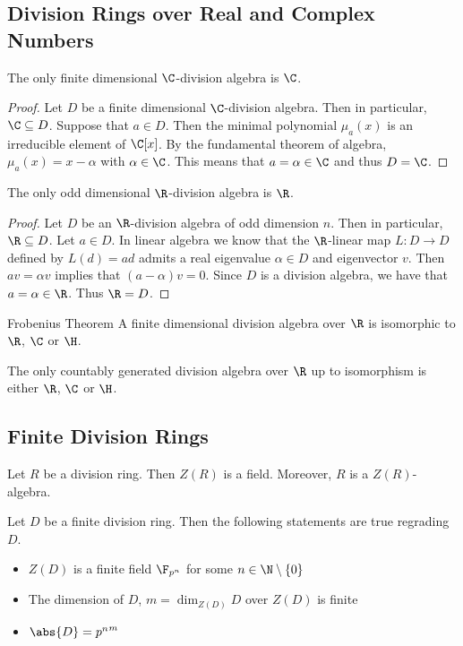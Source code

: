 \documentclass[a4paper]{article}
\begin{document}
\subsection{Division Rings over Real and Complex Numbers}
\begin{prp}{}{} The only finite dimensional $\C$-division algebra is $\C$. \tcbline
\begin{proof}
Let $D$ be a finite dimensional $\C$-division algebra. Then in particular, $\C\subseteq D$. Suppose that $a\in D$. Then the minimal polynomial $\mu_a(x)$ is an irreducible element of $\C[x]$. By the fundamental theorem of algebra, $\mu_a(x)=x-\alpha$ with $\alpha\in\C$. This means that $a=\alpha\in\C$ and thus $D=\C$. 
\end{proof}
\end{prp}

\begin{prp}{}{} The only odd dimensional $\R$-division algebra is $\R$. \tcbline
\begin{proof}
Let $D$ be an $\R$-division algebra of odd dimension $n$. Then in particular, $\R\subseteq D$. Let $a\in D$. In linear algebra we know that the $\R$-linear map $L:D\to D$ defined by $L(d)=ad$ admits a real eigenvalue $\alpha\in D$ and eigenvector $v$. Then $av=\alpha v$ implies that $(a-\alpha)v=0$. Since $D$ is a division algebra, we have that $a=\alpha\in\R$. Thus $\R=D$. 
\end{proof}
\end{prp}

\begin{thm}{Frobenius Theorem}{} A finite dimensional division algebra over $\R$ is isomorphic to $\R$, $\C$ or $\H$. 
\end{thm}

\begin{thm}{}{} The only countably generated division algebra over $\R$ up to isomorphism is either $\R$, $\C$ or $\H$. 
\end{thm}

\subsection{Finite Division Rings}
\begin{lmm}{}{} Let $R$ be a division ring. Then $Z(R)$ is a field. Moreover, $R$ is a $Z(R)$-algebra. 
\end{lmm}

\begin{crl}{}{} Let $D$ be a finite division ring. Then the following statements are true regrading $D$. 
\begin{itemize}
\item $Z(D)$ is a finite field $\F_{p^n}$ for some $n\in\N\setminus\{0\}$
\item The dimension of $D$, $m=\dim_{Z(D)}D$ over $Z(D)$ is finite
\item $\abs{D}={p^n}^m$
\end{itemize}
\end{crl}
\end{document}
